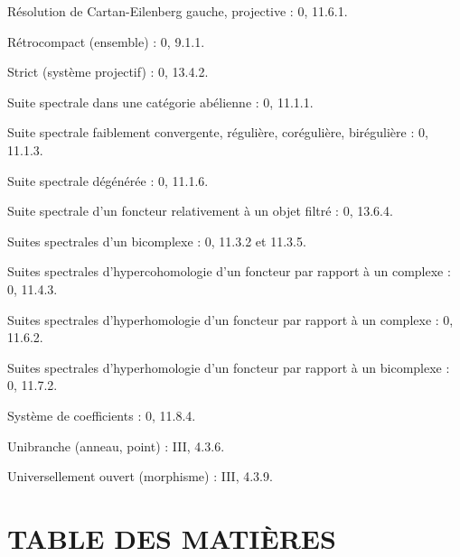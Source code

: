 \begin{flushleft}
Résolution de Cartan-Eilenberg gauche, projective : 0, 11.6.1.

Rétrocompact (ensemble) : 0, 9.1.1.

Strict (système projectif) : 0, 13.4.2.

Suite spectrale dans une catégorie abélienne : 0, 11.1.1.

Suite spectrale faiblement convergente, régulière, corégulière, birégulière :
0, 11.1.3.

Suite spectrale dégénérée : 0, 11.1.6.

Suite spectrale d'un foncteur relativement à un objet filtré : 0, 13.6.4.

Suites spectrales d'un bicomplexe : 0, 11.3.2 et 11.3.5.

Suites spectrales d'hypercohomologie d'un foncteur par rapport à un complexe :
0, 11.4.3.

Suites spectrales d'hyperhomologie d'un foncteur par rapport à un complexe :
0, 11.6.2.

Suites spectrales d'hyperhomologie d'un foncteur par rapport à un bicomplexe :
0, 11.7.2.

Système de coefficients : 0, 11.8.4.

Unibranche (anneau, point) : III, 4.3.6.

Universellement ouvert (morphisme) : III, 4.3.9.
\end{flushleft}

\clearpage
{}
\section*{TABLE DES MATIÈRES}

